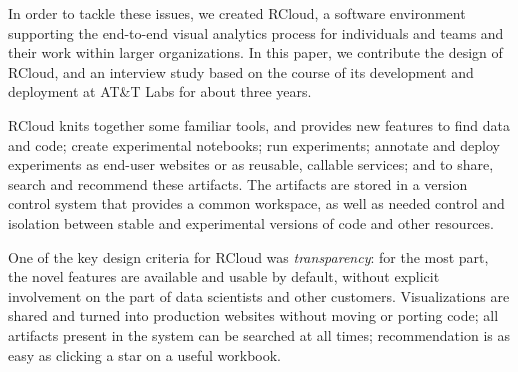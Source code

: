 
In order to tackle these issues, we created RCloud, a software environment
supporting the end-to-end visual analytics process for individuals and
teams and their work within larger organizations. In this paper, we
contribute the design of RCloud, and an interview study based on the
course of its development and deployment at AT\&T Labs for about three
years.

RCloud knits together some familiar tools, and 
provides new features to find data and code; create experimental notebooks;
run experiments; annotate and deploy experiments as end-user websites or
as reusable, callable services; and to share, search and recommend these artifacts.
The artifacts are stored in a version
control system that provides a common workspace, as well as needed control
and isolation between stable and experimental versions of code and other
resources. 

One of the key design criteria for RCloud was \emph{transparency}: for
the most part, the novel features are
available and usable by default, without explicit involvement on the part of
data scientists and other customers. Visualizations are
shared and turned into production websites without moving
or porting code; all artifacts present in the system can be
searched at all times; recommendation is as easy as clicking a star
on a useful workbook.

